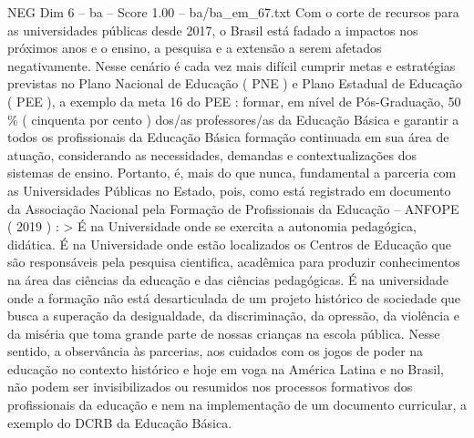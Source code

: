 \begin{textsample}{NEG Dim 6 – ba – Score 1.00 – ba/ba\_em\_67.txt}
Com o corte de recursos para as universidades públicas desde 2017, o Brasil está fadado a impactos nos próximos anos e o ensino, a pesquisa e a extensão a serem afetados negativamente.
Nesse cenário é cada vez mais difícil cumprir metas e estratégias previstas no Plano Nacional de Educação ( PNE ) e Plano Estadual de Educação ( PEE ), a exemplo da meta 16 do PEE : formar, em nível de Pós-Graduação, 50 \% ( cinquenta por cento ) dos/as professores/as da Educação Básica e garantir a todos os profissionais da Educação Básica formação continuada em sua área de atuação, considerando as necessidades, demandas e contextualizações dos sistemas de ensino.
Portanto, é, mais do que nunca, fundamental a parceria com as Universidades Públicas no Estado, pois, como está registrado em documento da Associação Nacional pela Formação de Profissionais da Educação – ANFOPE ( 2019 ) : > É na Universidade onde se exercita a autonomia pedagógica, didática.
É na Universidade onde estão localizados os Centros de Educação que são responsáveis pela pesquisa cientifica, acadêmica para produzir conhecimentos na área das ciências da educação e das ciências pedagógicas.
É na universidade onde a formação não está desarticulada de um projeto histórico de sociedade que busca a superação da desigualdade, da discriminação, da opressão, da violência e da miséria que toma grande parte de nossas crianças na escola pública.
Nesse sentido, a observância às parcerias, aos cuidados com os jogos de poder na educação no contexto histórico e hoje em voga na América Latina e no Brasil, não podem ser invisibilizados ou resumidos nos processos formativos dos profissionais da educação e nem na implementação de um documento curricular, a exemplo do DCRB da Educação Básica.

\end{textsample}
